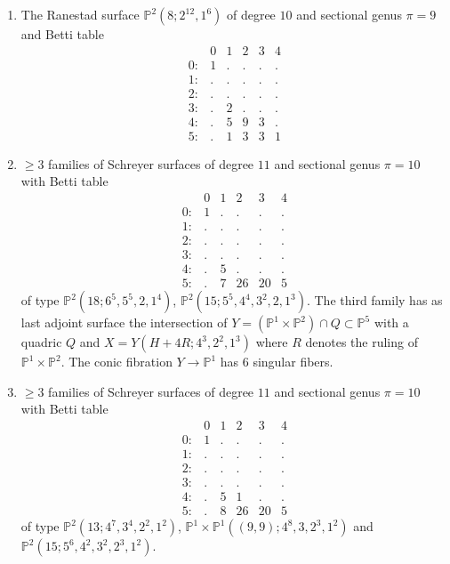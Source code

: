 \documentclass[twoside,12pt, leqno]{amsart}
\def\PP{{\mathbb P}}
\begin{document}
\begin{enumerate}
      
 \item The Ranestad surface $\PP^{2}(8;2^{12},1^{6})$ of degree $10$ and sectional genus $\pi=9$ and Betti table     
$$\begin{matrix}
        & 0 & 1 & 2 & 3 & 4\\
       0: & 1 & . & . & . & .\\
       1: & . & . & . & . & .\\
       2: & . & . & . & . & .\\
       3: & . & 2 & . & . & .\\
       4: & . & 5 & 9 & 3 & .\\
       5: & . & 1 & 3 & 3 & 1
       \end{matrix}$$


\item\label{schFamWiths=2} $\ge 3$ families of Schreyer surfaces of degree $11$ and sectional genus $\pi=10$ with Betti table
$$\begin{matrix}
       & 0 & 1 & 2 & 3 & 4\\
      0: & 1 & . & . & . & .\\
      1: & . & . & . & . & .\\
      2: & . & . & . & . & .\\
      3: & . & . & . & . & .\\
      4: & . & 5 & . & . & .\\
      5: & . & 7 & 26 & 20 & 5
      \end{matrix}$$
of type $\PP^{2}(18;6^{5},5^{5},2,1^{4})$, $\PP^{2}(15;5^{5},4^{4},3^{2},2,1^{3})$. The third family has as last adjoint surface the intersection of
$Y=(\PP^{1}\times \PP^{2})\cap Q \subset \PP^{5}$  with a quadric $Q$ and $X=Y(H+4R;4^{3},2^{2},1^{3})$
where $R$ denotes the ruling of $\PP^{1}\times \PP^{2}$. The conic fibration $Y \to \PP^{1}$ has 6 singular fibers.


\item\label{schFamWiths=3} $\ge 3$ families of Schreyer surfaces of  degree $11$ and sectional genus $\pi=10$ with Betti table
$$\begin{matrix}
       & 0 & 1 & 2 & 3 & 4\\
      0: & 1 & . & . & . & .\\
      1: & . & . & . & . & .\\
      2: & . & . & . & . & .\\
      3: & . & . & . & . & .\\
      4: & . & 5 & 1 & . & .\\
      5: & . & 8 & 26 & 20 & 5
      \end{matrix}$$
of type $\PP^{2}(13;4^{7},3^{4},2^{2},1^{2})$, $\PP^{1}\times \PP^{1}((9,9);4^{8},3,2^{3},1^{2})$ and $\PP^{2}(15;5^{6},4^{2},3^{2},2^{3},1^{2})$.
 

\end{enumerate}
\end{document}
